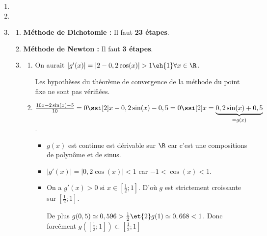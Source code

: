 \begin{enumerate}[label=R4.\arabic*, font=\bfseries, itemsep=8mm,labelsep*=4mm]
\begin{enumerate}[label=\roman*),itemsep=3mm]
\begin{itemize}[itemsep=2mm,left=0mm,labelsep*=2mm]
\end{itemize}
\end{enumerate}







\item
{}







\item
{}







\item
\begin{enumerate}[label=\alph*),itemsep=4mm,start=2]
\item \textbf{Méthode de Dichotomie :} Il faut \textbf{23 étapes}.
\item \textbf{Méthode de Newton :} Il faut \textbf{3 étapes}.
\item \begin{enumerate}[label=\roman*),itemsep=3mm]
\item On aurait $\vert g'(x)\vert=\vert2-0,2\cos(x)\vert >1 \eh{1}\forall x\in\R$.

\smallskip
Les hypothèses du théorème de convergence de la méthode du point fixe ne sont pas vérifiées.
\item $\frac{10x-2\sin(x)-5}{10}=0\ssi[2] x-0,2\sin(x)-0,5=0\ssi[2] x=\underbrace{0,2\sin(x)+0,5}_{=g(x)}$.

\smallskip
\begin{itemize}[itemsep=2mm]
\item $g(x)$ est continue est dérivable sur $\R$ car c'est une compositions de polynôme et de sinus.
\item $\vert g'(x)\vert=\vert 0,2\cos(x)\vert <1$  car $-1<\cos(x)<1$.
\item On a $g'(x)>0$  si $\textstyle x\in[\frac{1}{2};1]$. D'où $g$ est strictement croissante sur $\textstyle[\frac{1}{2};1]$.

\smallskip De plus $\textstyle g(0,5)\simeq 0,596>\frac{1}{2} \et{2} g(1)\simeq 0,668<1$. Donc forcément $\textstyle g([\frac{1}{2};1])\subset [\frac{1}{2};1]$
\end{itemize}


\end{enumerate}
\end{enumerate}
\end{enumerate}
